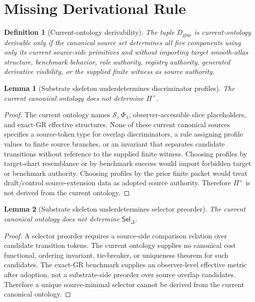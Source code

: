 \documentclass[11pt]{article}
\newcommand{\Sub}{\mathcal{S}}
\newcommand{\Prof}{\Pi^{+}}
\newcommand{\Sel}{\mathsf{Sel}_{\Delta}}
\newtheorem{definition}{Definition}
\newtheorem{lemma}{Lemma}
\begin{document}
\section{Missing Derivational Rule}

\begin{definition}[Current-ontology derivability]
The tuple \(D_{\mathrm{glue}}\) is current-ontology derivable only if the
canonical source set determines all five components using only its current
source-side primitives and without importing target smooth-atlas structure,
benchmark behavior, role authority, registry authority, generated derivative
visibility, or the supplied finite witness as source authority.
\end{definition}

\begin{lemma}[Substrate skeleton underdetermines discriminator profiles]
The current canonical ontology does not determine \(\Prof\).
\end{lemma}

\begin{proof}
The current ontology names \(\Sub\), \(\Phi_{\lambda}\), observer-accessible
slice placeholders, and exact-GR effective structures. None of these current
canonical sources specifies a source-token type for overlap discriminators, a
rule assigning profile values to finite source branches, or an invariant that
separates candidate transitions without reference to the supplied finite
witness. Choosing profiles by target-chart resemblance or by benchmark
success would import forbidden target or benchmark authority. Choosing
profiles by the prior finite packet would treat draft/control source-extension
data as adopted source authority. Therefore \(\Prof\) is not derived from the
current ontology.
\end{proof}

\begin{lemma}[Substrate skeleton underdetermines selector preorder]
The current canonical ontology does not determine \(\Sel\).
\end{lemma}

\begin{proof}
A selector preorder requires a source-side comparison relation over candidate
transition tokens. The current ontology supplies no canonical cost functional,
ordering invariant, tie-breaker, or uniqueness theorem for such candidates.
The exact-GR benchmark supplies an observer-level effective metric after
adoption, not a substrate-side preorder over source overlap candidates.
Therefore a unique source-minimal selector cannot be derived from the current
canonical ontology.
\end{proof}
\end{document}
